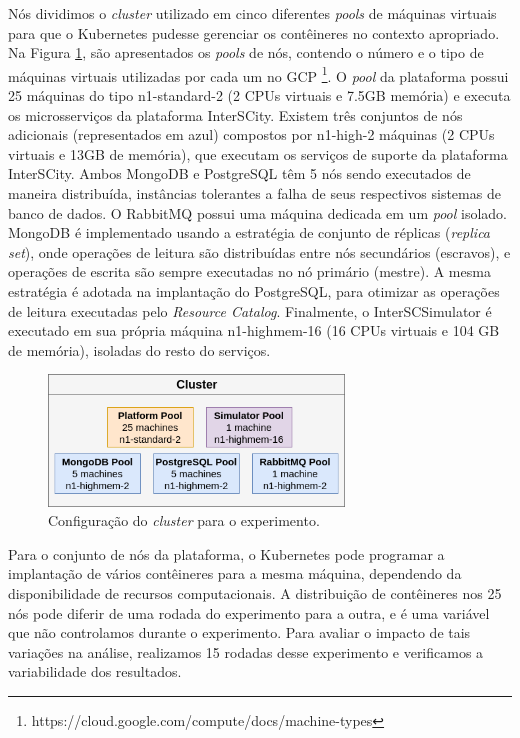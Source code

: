 Nós dividimos o \textit{cluster} utilizado em cinco diferentes \textit{pools} de máquinas virtuais para que o Kubernetes pudesse gerenciar os contêineres no contexto apropriado.
Na Figura \ref{fig:node-pools}, são apresentados os \textit{pools} de nós, contendo o número e o tipo de máquinas virtuais utilizadas por cada um no GCP
\footnote{https://cloud.google.com/compute/docs/machine-types}.
O \textit{pool} da plataforma possui 25 máquinas do tipo n1-standard-2 (2 CPUs virtuais e 7.5GB memória) e executa os microsserviços da plataforma InterSCity.
Existem três conjuntos de nós adicionais (representados em azul) compostos por n1-high-2 máquinas (2 CPUs virtuais e 13GB de memória), que executam os serviços de suporte da plataforma InterSCity.
Ambos MongoDB e PostgreSQL têm 5 nós sendo executados de maneira distribuída, instâncias tolerantes a falha de seus respectivos sistemas de banco de dados.
O RabbitMQ possui uma máquina dedicada em um \textit{pool} isolado.
MongoDB é implementado usando a estratégia de conjunto de réplicas (\textit{replica set}), onde operações de leitura são distribuídas entre nós secundários (escravos), e operações de escrita são
sempre executadas no nó primário (mestre).
A mesma estratégia é adotada na implantação do PostgreSQL, para otimizar as operações de leitura executadas pelo \textit{Resource Catalog}.
Finalmente, o InterSCSimulator é executado em sua própria máquina n1-highmem-16 (16 CPUs virtuais e 104 GB de memória), isoladas do resto do serviços.

\begin{figure}[ht]
	\centering
	\includegraphics[width=0.7\textwidth]{figuras/node-pools.png}
    \caption{Configuração do \textit{cluster} para o experimento.}
	\label{fig:node-pools}
\end{figure}


Para o conjunto de nós da plataforma, o Kubernetes pode programar a implantação de vários contêineres para a mesma máquina, dependendo da disponibilidade de recursos computacionais.
A distribuição de contêineres nos 25 nós pode diferir de uma rodada do experimento para a outra, e é uma variável que não controlamos durante o experimento.
Para avaliar o impacto de tais variações na análise, realizamos 15 rodadas desse experimento e verificamos a variabilidade dos resultados.

